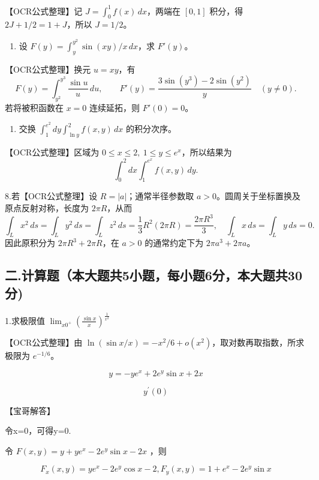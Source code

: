 \documentclass[11pt,fontset=fandol]{ctexart}
\providecommand{\tightlist}{\setlength{\itemsep}{0pt}\setlength{\parskip}{0pt}}
\begin{document}
【OCR公式整理】记 \(J=\int_0^1f(x)\,dx\)，两端在 \([0,1]\) 积分，得
\(2J+1/2=1+J\)，所以 \(J=1/2\)。

\begin{enumerate}
\def\labelenumi{\arabic{enumi}.}
\setcounter{enumi}{5}
\tightlist
\item
  设 \(F(y)=\int_y^{y^2}\sin(xy)/x\,dx\)，求 \(F'(y)\)。
\end{enumerate}

【OCR公式整理】换元 \(u=xy\)，有 \[
F(y)=\int_{y^2}^{y^3}\frac{\sin u}{u}\,du,\qquad
F'(y)=\frac{3\sin(y^3)-2\sin(y^2)}y\quad(y\ne0).
\] 若将被积函数在 \(x=0\) 连续延拓，则 \(F'(0)=0\)。

\begin{enumerate}
\def\labelenumi{\arabic{enumi}.}
\setcounter{enumi}{6}
\tightlist
\item
  交换 \(\int_1^{e^2}dy\int_{\ln y}^2f(x,y)\,dx\) 的积分次序。
\end{enumerate}

【OCR公式整理】区域为 \(0\le x\le2,\ 1\le y\le e^x\)，所以结果为 \[
\int_0^2dx\int_1^{e^x}f(x,y)\,dy.
\]

8.若【OCR公式整理】设 \(R=|a|\)；通常半径参数取
\(a>0\)。圆周关于坐标置换及原点反射对称，长度为 \(2\pi R\)，从而 \[
\int_Lx^2\,ds=\int_Ly^2\,ds=\int_Lz^2\,ds
=\frac13R^2(2\pi R)=\frac{2\pi R^3}{3},
\quad\int_Lx\,ds=\int_Ly\,ds=0.
\] 因此原积分为 \(2\pi R^3+2\pi R\)，在 \(a>0\) 的通常约定下为
\(2\pi a^3+2\pi a\)。

\subsection{二.计算题（本大题共5小题，每小题6分，本大题共30分)}\label{ux4e8c.ux8ba1ux7b97ux9898ux672cux5927ux9898ux51715ux5c0fux9898ux6bcfux5c0fux98986ux5206ux672cux5927ux9898ux517130ux5206}

1.求极限值
\(\lim _ { x  0 ^ { + } } ( \frac { \sin x } { x } ) ^ { \frac { 1 } { x ^ { 2 } } }\)

【OCR公式整理】由
\(\ln(\sin x/x)=-x^2/6+o(x^2)\)，取对数再取指数，所求极限为
\(e^{-1/6}\)。

\[
y = - y e ^ { x } + 2 e ^ { y } \sin x + 2 x
\]

\[
y ^ { \prime } ( 0 )
\]

【宝哥解答】

令x=0，可得y=0.

令 \(F ( x , y ) = y + y e ^ { x } - 2 e ^ { y } \sin x - 2 x\) ，则

\[
F _ { x } ( x , y ) = y e ^ { x } - 2 e ^ { y } \cos x - 2 , F _ { y } ( x , y ) = 1 + e ^ { x } - 2 e ^ { y } \sin x
\]
\end{document}
